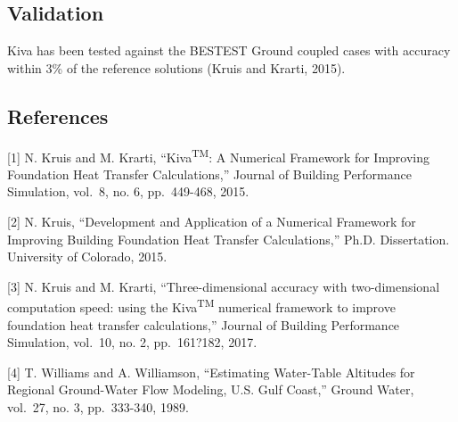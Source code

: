 \subsection{Validation}

Kiva has been tested against the BESTEST Ground coupled cases with
accuracy within 3\% of the reference solutions (Kruis and Krarti, 2015).

\subsection{References}

{[}1{]} N. Kruis and M. Krarti, ``Kiva\textsuperscript{TM}: A Numerical
Framework for Improving Foundation Heat Transfer Calculations,'' Journal
of Building Performance Simulation, vol.~8, no. 6, pp.~449-468, 2015.

{[}2{]} N. Kruis, ``Development and Application of a Numerical Framework for Improving Building Foundation Heat Transfer Calculations,''
Ph.D. Dissertation. University of Colorado, 2015.

{[}3{]} N. Kruis and M. Krarti, ``Three-dimensional accuracy with
two-dimensional computation speed: using the Kiva\textsuperscript{TM}
numerical framework to improve foundation heat transfer calculations,''
Journal of Building Performance Simulation, vol.~10, no. 2, pp.~161?182,
2017.

{[}4{]} T. Williams and A. Williamson, ``Estimating Water-Table
Altitudes for Regional Ground-Water Flow Modeling, U.S. Gulf Coast,''
Ground Water, vol.~27, no. 3, pp.~333-340, 1989.
